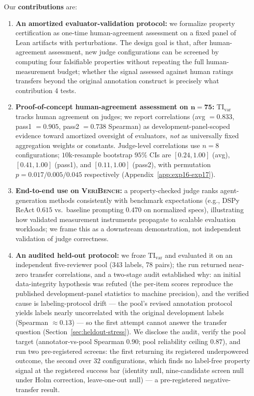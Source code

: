 \documentclass{article}
\begin{document}
Our \textbf{contributions} are:
\begin{enumerate}
  \item \textbf{An amortized evaluator-validation protocol:} we formalize property certification as one-time human-agreement assessment on a fixed panel of Lean artifacts with perturbations. The design goal is that, after human-agreement assessment, new judge configurations can be screened by computing four falsifiable properties without repeating the full human-measurement budget; whether the signal assessed against human ratings transfers beyond the original annotation construct is precisely what contribution 4 tests.

  \item \textbf{Proof-of-concept human-agreement assessment on \(\bm{n{=}75}\):} \(\mathrm{TI}_{\mathrm{var}}\) tracks human agreement on judges; we report correlations (avg \(=0.833\), pass1 \(=0.905\), pass2 \(=0.738\) Spearman) as development-panel-scoped evidence toward amortized oversight of evaluators, \emph{not} as universally fixed aggregation weights or constants. Judge-level correlations use \(n{=}8\) configurations; \(10\)k-resample bootstrap \(95\%\) CIs are \([0.24,1.00]\) (avg), \([0.41,1.00]\) (pass1), and \([0.11,1.00]\) (pass2), with permutation \(p=0.017/0.005/0.045\) respectively (Appendix~\ref{app:exp16-exp17}).
  \item \textbf{End-to-end use on \textsc{VeriBench}:} a property-checked judge ranks agent-generation methods consistently with benchmark expectations (e.g., DSPy ReAct \(0.615\) vs.\ baseline prompting \(0.470\) on normalized specs), illustrating how validated measurement instruments propagate to scalable evaluation workloads; we frame this as a downstream demonstration, not independent validation of judge correctness.
  \item \textbf{An audited held-out protocol:} we froze \(\mathrm{TI}_{\mathrm{var}}\) and evaluated it on an independent five-reviewer pool (343 labels, 78 pairs); the run returned near-zero transfer correlations, and a two-stage audit established why: an initial data-integrity hypothesis was refuted (the per-item scores reproduce the published development-panel statistics to machine precision), and the verified cause is labeling-protocol drift --- the pool's revised annotation protocol yields labels nearly uncorrelated with the original development labels (Spearman \(\approx 0.13\)) --- so the first attempt cannot answer the transfer question (Section~\ref{sec:heldout-stress}). We disclose the audit, verify the pool target (annotator-vs-pool Spearman \(0.90\); pool reliability ceiling \(0.87\)), and run two pre-registered screens: the first returning its registered underpowered outcome, the second over \(32\) configurations, which finds no label-free property signal at the registered success bar (identity null, nine-candidate screen null under Holm correction, leave-one-out null) --- a pre-registered negative-transfer result.
\end{enumerate}
\end{document}

